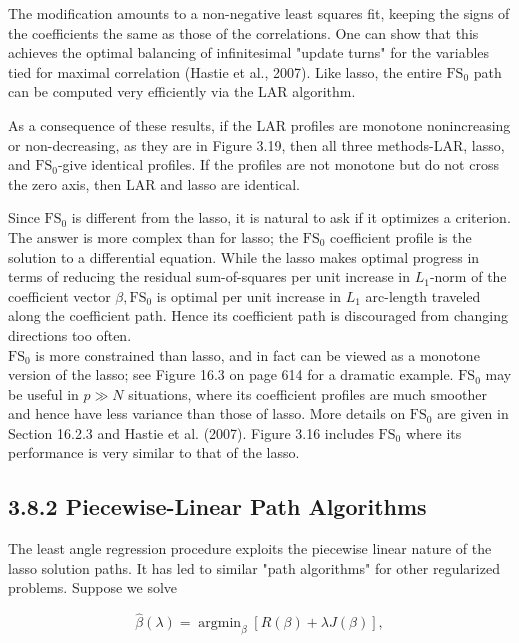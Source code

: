 \documentclass[10pt]{article}
\begin{document}
The modification amounts to a non-negative least squares fit, keeping the signs of the coefficients the same as those of the correlations. One can show that this achieves the optimal balancing of infinitesimal "update turns" for the variables tied for maximal correlation (Hastie et al., 2007). Like lasso, the entire $\mathrm{FS}_{0}$ path can be computed very efficiently via the LAR algorithm.

As a consequence of these results, if the LAR profiles are monotone nonincreasing or non-decreasing, as they are in Figure 3.19, then all three methods-LAR, lasso, and $\mathrm{FS}_{0}$-give identical profiles. If the profiles are not monotone but do not cross the zero axis, then LAR and lasso are identical.

Since $\mathrm{FS}_{0}$ is different from the lasso, it is natural to ask if it optimizes a criterion. The answer is more complex than for lasso; the $\mathrm{FS}_{0}$ coefficient profile is the solution to a differential equation. While the lasso makes optimal progress in terms of reducing the residual sum-of-squares per unit increase in $L_{1}$-norm of the coefficient vector $\beta, \mathrm{FS}_{0}$ is optimal per unit increase in $L_{1}$ arc-length traveled along the coefficient path. Hence its coefficient path is discouraged from changing directions too often.\\
$\mathrm{FS}_{0}$ is more constrained than lasso, and in fact can be viewed as a monotone version of the lasso; see Figure 16.3 on page 614 for a dramatic example. $\mathrm{FS}_{0}$ may be useful in $p \gg N$ situations, where its coefficient profiles are much smoother and hence have less variance than those of lasso. More details on $\mathrm{FS}_{0}$ are given in Section 16.2.3 and Hastie et al. (2007). Figure 3.16 includes $\mathrm{FS}_{0}$ where its performance is very similar to that of the lasso.

\subsection*{3.8.2 Piecewise-Linear Path Algorithms}
The least angle regression procedure exploits the piecewise linear nature of the lasso solution paths. It has led to similar "path algorithms" for other regularized problems. Suppose we solve


\begin{equation*}
\hat{\beta}(\lambda)=\operatorname{argmin}_{\beta}[R(\beta)+\lambda J(\beta)], \tag{3.76}
\end{equation*}
\end{document}

